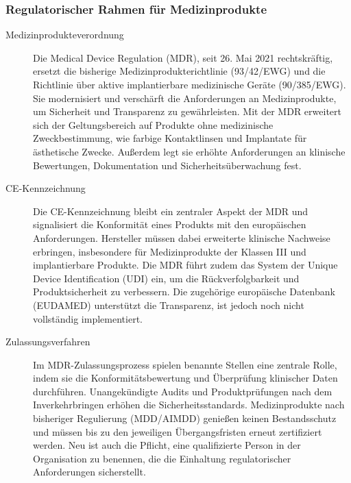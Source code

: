 \documentclass[a4paper, 12pt]{article}
\begin{document}
\subsubsection{Regulatorischer Rahmen für Medizinprodukte}\label{mdr_regulations}
\begin{description}
	\item[Medizinprodukteverordnung] \label{mdr}
	Die Medical Device Regulation (MDR), seit 26. Mai 2021 rechtskräftig, ersetzt die 		bisherige Medizinprodukterichtlinie (93/42/EWG) und die Richtlinie über aktive implantierbare medizinische Geräte (90/385/EWG). Sie modernisiert und verschärft die Anforderungen an Medizinprodukte, um Sicherheit und Transparenz zu gewährleisten. Mit der MDR erweitert sich der Geltungsbereich auf Produkte ohne medizinische Zweckbestimmung, wie farbige Kontaktlinsen und Implantate für ästhetische Zwecke. Außerdem legt sie erhöhte Anforderungen an klinische Bewertungen, Dokumentation und Sicherheitsüberwachung fest.
	
	\item[CE-Kennzeichnung] \label{ce}
	Die CE-Kennzeichnung bleibt ein zentraler Aspekt der MDR und signalisiert die Konformität eines Produkts mit den europäischen Anforderungen. Hersteller müssen dabei erweiterte klinische Nachweise erbringen, insbesondere für Medizinprodukte der Klassen III und implantierbare Produkte. Die MDR führt zudem das System der Unique Device Identification (UDI) ein, um die Rückverfolgbarkeit und Produktsicherheit zu verbessern. Die zugehörige europäische Datenbank (EUDAMED) unterstützt die Transparenz, ist jedoch noch nicht vollständig implementiert.
	
	\item[Zulassungsverfahren]
	Im MDR-Zulassungsprozess spielen benannte Stellen eine zentrale Rolle, indem sie die Konformitätsbewertung und Überprüfung klinischer Daten durchführen. Unangekündigte Audits und Produktprüfungen nach dem Inverkehrbringen erhöhen die Sicherheitsstandards. Medizinprodukte nach bisheriger Regulierung (MDD/AIMDD) genießen keinen Bestandsschutz und müssen bis zu den jeweiligen Übergangsfristen erneut zertifiziert werden. Neu ist auch die Pflicht, eine qualifizierte Person in der Organisation zu benennen, die die Einhaltung regulatorischer Anforderungen sicherstellt.
	
\end{description}
\cite{tüv_süd_mdr}
\end{document}
